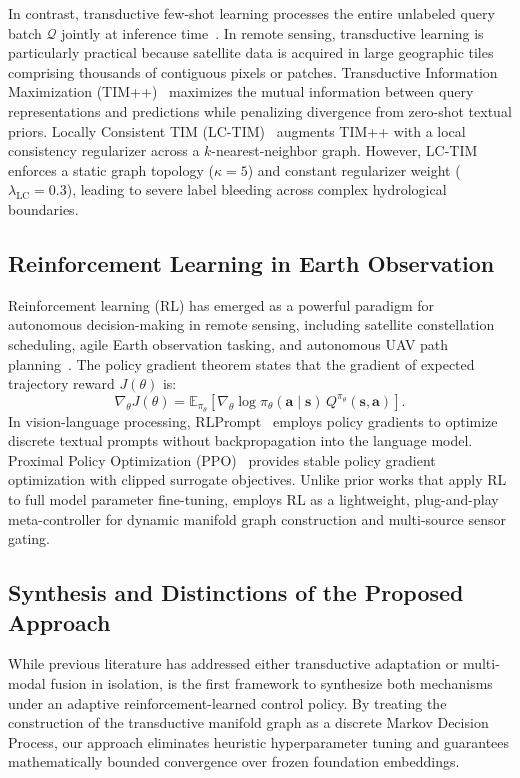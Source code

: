 In contrast, transductive few-shot learning processes the entire unlabeled query batch $\mathcal{Q}$ jointly at inference time~\cite{boudriki2020transductive,zanella2024boosting,li2026timplusplus,elkhoury2026lctim}. In remote sensing, transductive learning is particularly practical because satellite data is acquired in large geographic tiles comprising thousands of contiguous pixels or patches. Transductive Information Maximization (TIM++)~\cite{li2026timplusplus} maximizes the mutual information between query representations and predictions while penalizing divergence from zero-shot textual priors. Locally Consistent TIM (LC-TIM)~\cite{elkhoury2026lctim} augments TIM++ with a local consistency regularizer across a $k$-nearest-neighbor graph. However, LC-TIM enforces a static graph topology ($\kappa=5$) and constant regularizer weight ($\lambda_{\text{LC}}=0.3$), leading to severe label bleeding across complex hydrological boundaries.

\subsection{Reinforcement Learning in Earth Observation}
Reinforcement learning (RL) has emerged as a powerful paradigm for autonomous decision-making in remote sensing, including satellite constellation scheduling, agile Earth observation tasking, and autonomous UAV path planning~\cite{sutton2018reinforcement,schulman2017proximal,khan2022deep}. The policy gradient theorem states that the gradient of expected trajectory reward $J(\theta)$ is:
\begin{equation}
    \nabla_\theta J(\theta) = \mathbb{E}_{\pi_\theta} \left[ \nabla_\theta \log \pi_\theta(\mathbf{a} \mid \mathbf{s}) \, Q^{\pi_\theta}(\mathbf{s}, \mathbf{a}) \right].
\end{equation}
In vision-language processing, RLPrompt~\cite{sun2022rlprompt} employs policy gradients to optimize discrete textual prompts without backpropagation into the language model. Proximal Policy Optimization (PPO)~\cite{schulman2017proximal} provides stable policy gradient optimization with clipped surrogate objectives. Unlike prior works that apply RL to full model parameter fine-tuning, \rllctim{} employs RL as a lightweight, plug-and-play meta-controller for dynamic manifold graph construction and multi-source sensor gating.

\subsection{Synthesis and Distinctions of the Proposed Approach}
While previous literature has addressed either transductive adaptation or multi-modal fusion in isolation, \rllctim{} is the first framework to synthesize both mechanisms under an adaptive reinforcement-learned control policy. By treating the construction of the transductive manifold graph as a discrete Markov Decision Process, our approach eliminates heuristic hyperparameter tuning and guarantees mathematically bounded convergence over frozen foundation embeddings.
